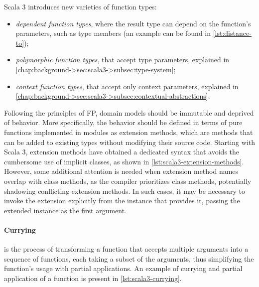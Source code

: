 Scala 3 introduces new varieties of function types:
\begin{itemize}
    \item \textit{dependent function types}, where the result type can depend on the function's parameters, such as type members (an example can be found in \cref{lst:distance-to});
    \item \textit{polymorphic function types}, that accept type parameters, explained in \cref{chap:background->sec:scala3->subsec:type-system};
    \item \textit{context function types}, that accept only context parameters, explained in \cref{chap:background->sec:scala3->subsec:contextual-abstractions}.
\end{itemize}

Following the principles of \ac{FP}, domain models should be immutable and deprived of behavior.
%
More specifically, the behavior should be defined in terms of pure functions implemented in modules as extension methods, which are methods that can be added to existing types without modifying their source code.
%
Starting with Scala 3, extension methods have obtained a dedicated syntax that avoids the cumbersome use of implicit classes, as shown in \cref{lst:scala3-extension-methods}.
%
However, some additional attention is needed when extension method names overlap with class methods, as the compiler prioritizes class methods, potentially shadowing conflicting extension methods.
%
In such cases, it may be necessary to invoke the extension explicitly from the instance that provides it, passing the extended instance as the first argument.



\paragraph{Currying} is the process of transforming a function that accepts multiple arguments into a sequence of functions, each taking a subset of the arguments, thus simplifying the function's usage with partial applications.
%
An example of currying and partial application of a function is present in \cref{lst:scala3-currying}.




